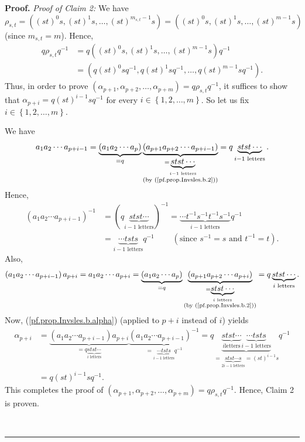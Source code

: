 \documentclass[numbers=enddot,12pt,final,onecolumn,notitlepage,abstracton]{scrartcl}%
\theoremstyle{definition}
\newenvironment{proof}[1][Proof]{\noindent\textbf{#1.} }{\ \rule{0.5em}{0.5em}}
\begin{document}
\begin{proof}
\textit{Proof of Claim 2:} We have%
\[
\rho_{s,t}=\left(  \left(  st\right)  ^{0}s,\left(  st\right)  ^{1}%
s,\ldots,\left(  st\right)  ^{m_{s,t}-1}s\right)  =\left(  \left(  st\right)
^{0}s,\left(  st\right)  ^{1}s,\ldots,\left(  st\right)  ^{m-1}s\right)
\]
(since $m_{s,t}=m$). Hence,%
\begin{align*}
q\rho_{s,t}q^{-1}  &  =q\left(  \left(  st\right)  ^{0}s,\left(  st\right)
^{1}s,\ldots,\left(  st\right)  ^{m-1}s\right)  q^{-1}\\
&  =\left(  q\left(  st\right)  ^{0}sq^{-1},q\left(  st\right)  ^{1}%
sq^{-1},\ldots,q\left(  st\right)  ^{m-1}sq^{-1}\right)  .
\end{align*}
Thus, in order to prove $\left(  \alpha_{p+1},\alpha_{p+2},\ldots,\alpha
_{p+m}\right)  =q\rho_{s,t}q^{-1}$, it suffices to show that $\alpha
_{p+i}=q\left(  st\right)  ^{i-1}sq^{-1}$ for every $i\in\left\{
1,2,\ldots,m\right\}  $. So let us fix $i\in\left\{  1,2,\ldots,m\right\}  $.

We have%
\[
a_{1}a_{2}\cdots a_{p+i-1}=\underbrace{\left(  a_{1}a_{2}\cdots a_{p}\right)
}_{=q}\underbrace{\left(  a_{p+1}a_{p+2}\cdots a_{p+i-1}\right)
}_{\substack{=\underbrace{stst\cdots}_{i-1\text{ letters}}\\\text{(by
(\ref{pf.prop.Invsles.b.2}))}}}=q\underbrace{stst\cdots}_{i-1\text{ letters}%
}.
\]
Hence,%
\begin{align*}
\left(  a_{1}a_{2}\cdots a_{p+i-1}\right)  ^{-1}  &  =\left(
q\underbrace{stst\cdots}_{i-1\text{ letters}}\right)  ^{-1}=\underbrace{\cdots
t^{-1}s^{-1}t^{-1}s^{-1}}_{i-1\text{ letters}}q^{-1}\\
&  =\underbrace{\cdots tsts}_{i-1\text{ letters}}q^{-1}%
\ \ \ \ \ \ \ \ \ \ \left(  \text{since }s^{-1}=s\text{ and }t^{-1}=t\right)
.
\end{align*}
Also,%
\[
\left(  a_{1}a_{2}\cdots a_{p+i-1}\right)  a_{p+i}=a_{1}a_{2}\cdots
a_{p+i}=\underbrace{\left(  a_{1}a_{2}\cdots a_{p}\right)  }_{=q}%
\underbrace{\left(  a_{p+1}a_{p+2}\cdots a_{p+i}\right)  }%
_{\substack{=\underbrace{stst\cdots}_{i\text{ letters}}\\\text{(by
(\ref{pf.prop.Invsles.b.2}))}}}=q\underbrace{stst\cdots}_{i\text{ letters}}.
\]
Now, (\ref{pf.prop.Invsles.b.alpha}) (applied to $p+i$ instead of $i$) yields%
\begin{align*}
\alpha_{p+i}  &  =\underbrace{\left(  a_{1}a_{2}\cdots a_{p+i-1}\right)
a_{p+i}}_{=q\underbrace{stst\cdots}_{i\text{ letters}}}\underbrace{\left(
a_{1}a_{2}\cdots a_{p+i-1}\right)  ^{-1}}_{=\underbrace{\cdots tsts}%
_{i-1\text{ letters}}q^{-1}}=q\underbrace{\underbrace{stst\cdots}_{i\text{
letters}}\underbrace{\cdots tsts}_{i-1\text{ letters}}}%
_{=\underbrace{stst\cdots s}_{2i-1\text{ letters}}=\left(  st\right)  ^{i-1}%
s}q^{-1}\\
&  =q\left(  st\right)  ^{i-1}sq^{-1}.
\end{align*}
This completes the proof of $\left(  \alpha_{p+1},\alpha_{p+2},\ldots
,\alpha_{p+m}\right)  =q\rho_{s,t}q^{-1}$. Hence, Claim 2 is proven.


\end{proof}
\end{document}
